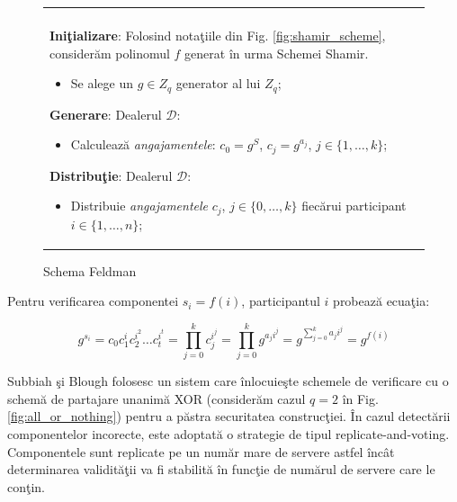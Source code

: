 \documentclass{llncs}
\begin{document}
\begin{figure}[h!]

\begin{tabular}{|p{\textwidth}|}
\hline

\\
\hspace{.1in}
\textbf{Ini\c{t}ializare}: 
	Folosind nota\c{t}iile din Fig. \ref{fig:shamir_scheme}, consider\u{a}m polinomul $f$ generat \^{i}n urma Schemei Shamir.
	\begin{itemize}
		\item Se alege un $g \in Z_q$ generator al lui $Z_q$;
	\end{itemize}
\medskip

\hspace{.1in}
\textbf{Generare}: Dealerul $\mathcal{D}$:
	\begin{itemize}
		\item Calculeaz\u{a} \textit{angajamentele}: $c_0 = g^S$, $c_j = g^{a_j}$, $j \in \{1,\dots,k\}$;
	\end{itemize}
\medskip

\hspace{.1in}
\textbf{Distribu\c{t}ie}: Dealerul $\mathcal{D}$:
	\begin{itemize}
		\item Distribuie \textit{angajamentele} $c_j$, $j \in \{0,\dots,k\}$ fiec\u{a}rui participant $i\in \{1,\dots,n\}$;
	\end{itemize}

\hspace{.1in}
\\
\hline
\end{tabular}

\caption{Schema Feldman \cite{Feldman:1987}}
\label{fig:feldman_scheme}
\end{figure}

Pentru verificarea componentei $s_i = f(i)$, participantul $i$ probeaz\u{a} ecua\c{t}ia:

\begin{equation}
	g^{s_i} = c_0c_1^ic_2^{i^2} \dots c_t^{i^t} = \prod_{j=0}^k c_j^{i^j} = \prod_{j=0}^k g^{a_ji^j} = g^{\sum\limits_{j=0}^k a_ji^j} = g^{f(i)}
\end{equation}

Subbiah \c{s}i Blough folosesc un sistem care \^{i}nlocuie\c{s}te schemele de verificare cu o schem\u{a} de partajare unanim\u{a} XOR (consider\u{a}m cazul $q = 2$ \^{i}n Fig. \ref{fig:all_or_nothing}) pentru a p\u{a}stra securitatea construc\c{t}iei.
\^{I}n cazul detect\u{a}rii componentelor incorecte, este adoptat\u{a} o strategie de tipul replicate-and-voting.
Componentele sunt replicate pe un num\u{a}r mare de servere astfel \^{i}nc\^{a}t determinarea validit\u{a}\c{t}ii va fi stabilit\u{a} \^{i}n func\c{t}ie de num\u{a}rul de servere care le con\c{t}in.
\end{document}
